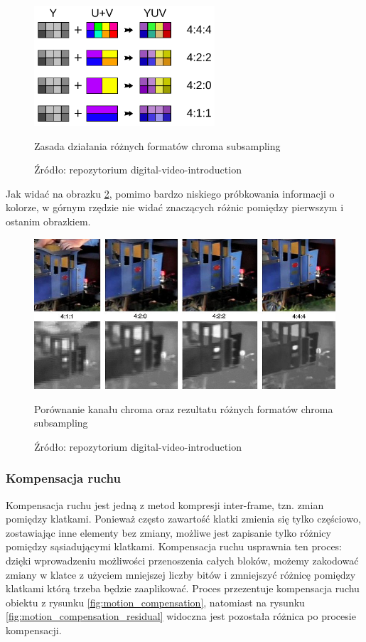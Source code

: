 \begin{figure}[H]
    \centering
    \includegraphics[width=0.6\textwidth]{img/rozdzial2/chroma_subsampling_ratios}
    \caption{Zasada działania różnych formatów chroma subsampling}
    \caption*{Źródło: repozytorium digital-video-introduction \cite{digital_video_introduction}}
    \label{fig:chroma_subsampling_ratios}
\end{figure}

Jak widać na obrazku \ref{fig:chroma_subsampling_comparison}, pomimo bardzo niskiego próbkowania
informacji o kolorze, w górnym rzędzie nie widać znaczących różnic pomiędzy pierwszym i ostanim
obrazkiem.

\begin{figure}[H]
    \centering
    \includegraphics[width=\textwidth]{img/rozdzial2/chroma_subsampling_examples}
    \caption{Porównanie kanału chroma oraz rezultatu różnych formatów chroma subsampling}
    \caption*{Źródło: repozytorium digital-video-introduction \cite{digital_video_introduction}}
    \label{fig:chroma_subsampling_comparison}
\end{figure}

\subsubsection{Kompensacja ruchu}

Kompensacja ruchu jest jedną z metod kompresji inter-frame, tzn. zmian pomiędzy klatkami. Ponieważ
często zawartość klatki zmienia się tylko częściowo, zostawiając inne elementy bez zmiany, możliwe
jest zapisanie tylko różnicy pomiędzy sąsiadującymi klatkami. Kompensacja ruchu usprawnia ten
proces: dzięki wprowadzeniu możliwości przenoszenia całych bloków, możemy zakodować zmiany w klatce
z użyciem mniejszej liczby bitów i zmniejszyć różnicę pomiędzy klatkami którą trzeba będzie
zaaplikować. Proces przezentuje kompensacja ruchu obiektu z rysunku \ref{fig:motion_compensation},
natomiast na rysunku \ref{fig:motion_compensation_residual} widoczna jest pozostała różnica po
procesie kompensacji.


